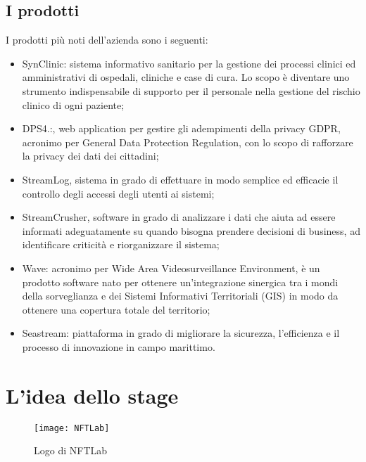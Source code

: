 \subsection{I prodotti}

I prodotti più noti dell'azienda sono i seguenti:
\begin{itemize}
	\item SynClinic: sistema informativo sanitario per la gestione dei processi clinici ed amministrativi di ospedali, cliniche e case di cura. Lo scopo è diventare uno strumento indispensabile di supporto per il personale nella gestione del rischio clinico di ogni paziente;
	\item DPS4.:, web application per gestire gli adempimenti della privacy GDPR, acronimo per General Data Protection Regulation, con lo scopo di rafforzare la privacy dei dati dei cittadini;
	\item StreamLog, sistema in grado di effettuare in modo semplice ed efficacie il controllo degli accessi degli utenti ai sistemi;
	\item StreamCrusher, software in grado di analizzare i dati che aiuta ad essere informati adeguatamente su quando bisogna prendere decisioni di business, ad identificare criticità e riorganizzare il sistema;
	\item Wave: acronimo per Wide Area Videosurveillance Environment, è un prodotto software nato per ottenere un'integrazione sinergica tra i mondi della sorveglianza e dei Sistemi Informativi Territoriali (GIS) in modo da ottenere una copertura totale del territorio;
	\item Seastream: piattaforma in grado di migliorare la sicurezza, l'efficienza e il processo di innovazione in campo marittimo.
\end{itemize}

\section{L'idea dello stage}

\begin{figure}[h]
	\begin{center}
		\texttt{[image: NFTLab]}
		\caption{Logo di NFTLab}
	\end{center}
\end{figure}

